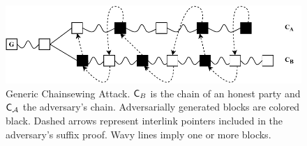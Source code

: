 \begin{figure}[h]
	\begin{center}
		\includegraphics[width=0.95\columnwidth
		]{figures/generic_chainsewing_attack.pdf}
	\end{center}
	\caption{Generic Chainsewing Attack. $\mathsf{C}_B$ is the chain of an honest party and $\mathsf{C}_\mathcal{A}$ the adversary's chain. Adversarially generated blocks are 	colored black. Dashed arrows represent interlink pointers included in the	adversary's suffix proof. Wavy lines imply one or more blocks.}
	\label{fig:generic_attack}
\end{figure}

